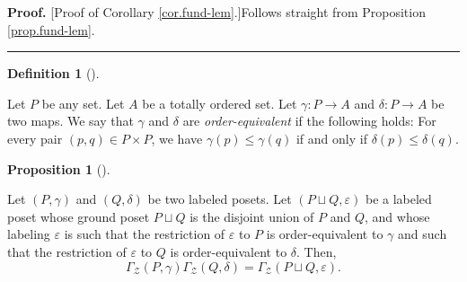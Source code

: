 \documentclass[numbers=enddot,12pt,final,onecolumn,notitlepage]{scrartcl}%
\theoremstyle{definition}
\newtheorem{prop}[theo]{Proposition}
\newenvironment{proposition}[1][]
{\begin{prop}[#1]\begin{leftbar}}
{\end{leftbar}\end{prop}}
\newtheorem{defi}[theo]{Definition}
\newenvironment{definition}[1][]
{\begin{defi}[#1]\begin{leftbar}}
{\end{leftbar}\end{defi}}
\newenvironment{proof}[1][Proof]{\noindent\textbf{#1.} }{\ \rule{0.5em}{0.5em}}
\begin{document}
\begin{proof}
[Proof of Corollary \ref{cor.fund-lem}.]Follows straight from Proposition
\ref{prop.fund-lem}.
\end{proof}

\begin{definition}
Let $P$ be any set. Let $A$ be a totally ordered set. Let $\gamma:P\rightarrow
A$ and $\delta:P\rightarrow A$ be two maps. We say that $\gamma$ and $\delta$
are \textit{order-equivalent} if the following holds: For every pair $\left(
p,q\right)  \in P\times P$, we have $\gamma\left(  p\right)  \leq\gamma\left(
q\right)  $ if and only if $\delta\left(  p\right)  \leq\delta\left(
q\right)  $.
\end{definition}

\begin{proposition}
\label{prop.prod1}Let $\left(  P,\gamma\right)  $ and $\left(  Q,\delta
\right)  $ be two labeled posets. Let $\left(  P\sqcup Q,\varepsilon\right)  $
be a labeled poset whose ground poset $P\sqcup Q$ is the disjoint union of $P$
and $Q$, and whose labeling $\varepsilon$ is such that the restriction of
$\varepsilon$ to $P$ is order-equivalent to $\gamma$ and such that the
restriction of $\varepsilon$ to $Q$ is order-equivalent to $\delta$. Then,%
\[
\Gamma_{\mathcal{Z}}\left(  P,\gamma\right)  \Gamma_{\mathcal{Z}}\left(
Q,\delta\right)  =\Gamma_{\mathcal{Z}}\left(  P\sqcup Q,\varepsilon\right)  .
\]

\end{proposition}
\end{document}
